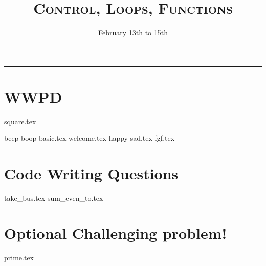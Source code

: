 \documentclass{exam}
\title{\textsc{Control, Loops, Functions}}
\date{February 13th to 15th}
\begin{document}
\maketitle
\rule{\textwidth}{0.15em}
\fontsize{12}{15}\selectfont


\section{WWPD}
\begin{questions}
{square.tex}


{beep-boop-basic.tex}
\newpage
{welcome.tex}
{happy-sad.tex}
{fgf.tex}
\end{questions}

\newpage
\section{Code Writing Questions}
\begin{questions}
{take_bus.tex}
{sum_even_to.tex}
\newpage
\section{Optional Challenging problem!}
{prime.tex}

\end{questions}
\end{document}
